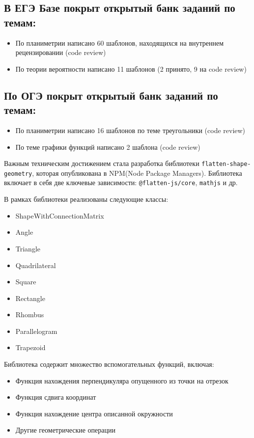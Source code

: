 \documentclass[a4paper, 12pt]{extarticle}
\begin{document}
\subsection*{В ЕГЭ Базе покрыт открытый банк заданий по темам:}
\begin{itemize}
	\item По планиметрии написано 60 шаблонов, находящихся на внутреннем рецензировании (code review)
	\item По теории вероятности написано 11 шаблонов (2  принято, 9 на code review)
\end{itemize}

\subsection*{По ОГЭ покрыт открытый банк заданий по темам:}
\begin{itemize}
	\item По планиметрии написано 16 шаблонов по теме треугольники (code review)
\end{itemize}

\begin{itemize}
	\item По теме графики функций написано 2 шаблона (code review)
\end{itemize}


Важным техническим достижением стала разработка библиотеки \texttt{flatten-shape-geometry}, которая опубликована в NPM(Node Package Managers). Библиотека включает в себя две ключевые зависимости: \texttt{@flatten-js/core}, \texttt{mathjs} и др.

В рамках библиотеки реализованы следующие классы:
\begin{itemize}
    \item ShapeWithConnectionMatrix
    \item Angle
    \item Triangle
    \item Quadrilateral
    \item Square
    \item Rectangle
    \item Rhombus
    \item Parallelogram
    \item Trapezoid
\end{itemize}

Библиотека содержит множество вспомогательных функций, включая:
\begin{itemize}
    \item Функция нахождения перпендикуляра опущенного из точки на отрезок
    \item Функция сдвига координат
    \item Функция нахождение центра описанной окружности
    \item Другие геометрические операции
\end{itemize}
\end{document}
